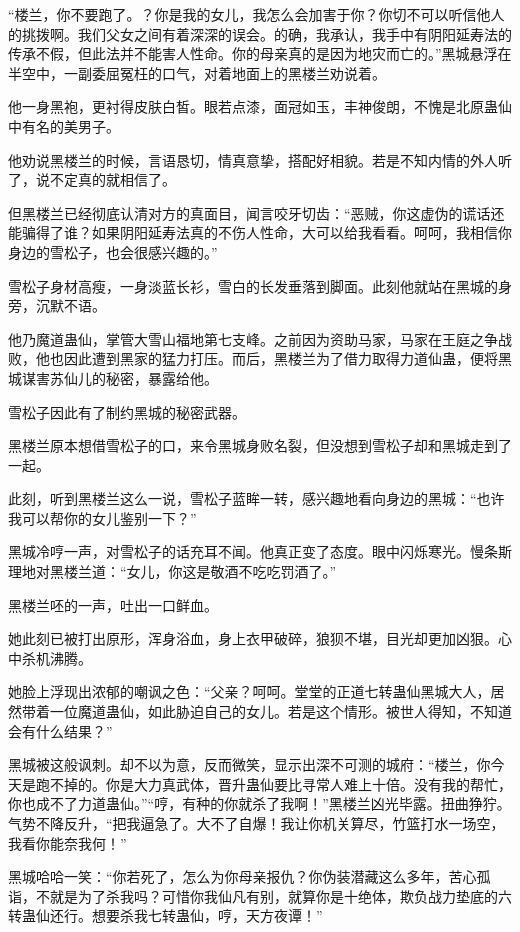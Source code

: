 
\begin{this_body}

“楼兰，你不要跑了。？你是我的女儿，我怎么会加害于你？你切不可以听信他人的挑拨啊。我们父女之间有着深深的误会。的确，我承认，我手中有阴阳延寿法的传承不假，但此法并不能害人性命。你的母亲真的是因为地灾而亡的。”黑城悬浮在半空中，一副委屈冤枉的口气，对着地面上的黑楼兰劝说着。

他一身黑袍，更衬得皮肤白皙。眼若点漆，面冠如玉，丰神俊朗，不愧是北原蛊仙中有名的美男子。

他劝说黑楼兰的时候，言语恳切，情真意挚，搭配好相貌。若是不知内情的外人听了，说不定真的就相信了。

但黑楼兰已经彻底认清对方的真面目，闻言咬牙切齿：“恶贼，你这虚伪的谎话还能骗得了谁？如果阴阳延寿法真的不伤人性命，大可以给我看看。呵呵，我相信你身边的雪松子，也会很感兴趣的。”

雪松子身材高瘦，一身淡蓝长衫，雪白的长发垂落到脚面。此刻他就站在黑城的身旁，沉默不语。

他乃魔道蛊仙，掌管大雪山福地第七支峰。之前因为资助马家，马家在王庭之争战败，他也因此遭到黑家的猛力打压。而后，黑楼兰为了借力取得力道仙蛊，便将黑城谋害苏仙儿的秘密，暴露给他。

雪松子因此有了制约黑城的秘密武器。

黑楼兰原本想借雪松子的口，来令黑城身败名裂，但没想到雪松子却和黑城走到了一起。

此刻，听到黑楼兰这么一说，雪松子蓝眸一转，感兴趣地看向身边的黑城：“也许我可以帮你的女儿鉴别一下？”

黑城冷哼一声，对雪松子的话充耳不闻。他真正变了态度。眼中闪烁寒光。慢条斯理地对黑楼兰道：“女儿，你这是敬酒不吃吃罚酒了。”

黑楼兰呸的一声，吐出一口鲜血。

她此刻已被打出原形，浑身浴血，身上衣甲破碎，狼狈不堪，目光却更加凶狠。心中杀机沸腾。

她脸上浮现出浓郁的嘲讽之色：“父亲？呵呵。堂堂的正道七转蛊仙黑城大人，居然带着一位魔道蛊仙，如此胁迫自己的女儿。若是这个情形。被世人得知，不知道会有什么结果？”

黑城被这般讽刺。却不以为意，反而微笑，显示出深不可测的城府：“楼兰，你今天是跑不掉的。你是大力真武体，晋升蛊仙要比寻常人难上十倍。没有我的帮忙，你也成不了力道蛊仙。”“哼，有种的你就杀了我啊！”黑楼兰凶光毕露。扭曲狰狞。气势不降反升，“把我逼急了。大不了自爆！我让你机关算尽，竹篮打水一场空，我看你能奈我何！”

黑城哈哈一笑：“你若死了，怎么为你母亲报仇？你伪装潜藏这么多年，苦心孤诣，不就是为了杀我吗？可惜你我仙凡有别，就算你是十绝体，欺负战力垫底的六转蛊仙还行。想要杀我七转蛊仙，哼，天方夜谭！”


\end{this_body}
